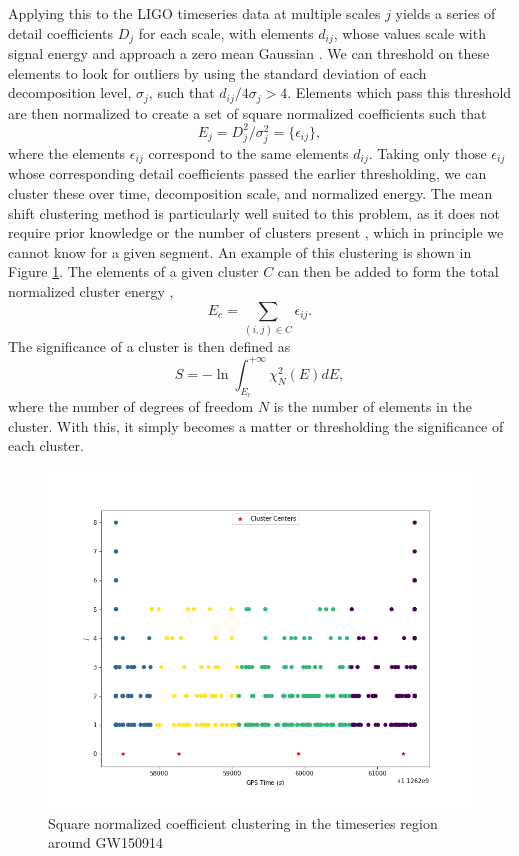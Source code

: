 \documentclass{article}
\begin{document}
Applying this to the LIGO timeseries data at multiple scales $j$ \cite{Wasilewski} yields a series of detail coefficients $D_{j}$ for each scale, with elements $d_{ij}$, whose values scale with signal energy and approach a zero mean Gaussian \cite{Blackburn2007}. We can threshold on these elements to look for outliers by using the standard deviation of each decomposition level, $\sigma_{j}$, such that $d_{ij}/4\sigma_{j} > 4$. Elements which pass this threshold are then normalized to create a set of square normalized coefficients such that
\begin{equation}
E_{j} = D_{j}^{2}/\sigma_{j}^{2} = \{\epsilon_{ij}\},
\end{equation}
where the elements $\epsilon_{ij}$ correspond to the same elements $d_{ij}$. Taking only those $\epsilon_{ij}$ whose corresponding detail coefficients passed the earlier thresholding, we can cluster these over time, decomposition scale, and normalized energy. The mean shift clustering method is particularly well suited to this problem, as it does not require prior knowledge or the number of clusters present \cite{Ivezic2014}, which in principle we cannot know for a given segment. An example of this clustering is shown in Figure \ref{fig:cluster}. The elements of a given cluster $C$ can then be added to form the total normalized cluster energy \cite{Blackburn2007},
\begin{equation}
E_{c} = \sum_{(i,j)\in C}\epsilon_{ij}. \label{eq:Ec}
\end{equation}
The significance of a cluster is then defined as \cite{Blackburn2007}
\begin{equation}
S=-\ln\int_{E_{c}}^{+\infty}\chi_{N}^{2}(E)dE, \label{eq:significance}
\end{equation}
where the number of degrees of freedom $N$ is the number of elements in the cluster. With this, it simply becomes a matter or thresholding the significance of each cluster.

\begin{figure}
\includegraphics[width=\textwidth]{GW150914_cluster.png}
\caption{Square normalized coefficient clustering in the timeseries region around GW150914}
\label{fig:cluster}
\end{figure}
\end{document}
